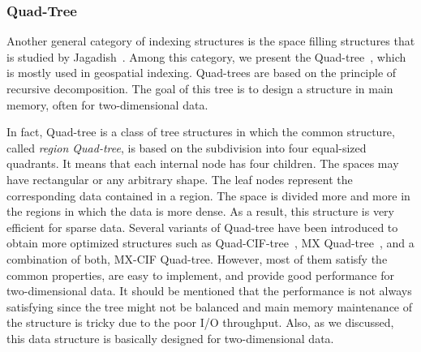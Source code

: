 \documentclass[a4paper,12pt]{article}
\begin{document}
\subsubsection{Quad-Tree}
\label{quad-tree-based}
Another general category of indexing structures is the space filling structures that is studied by Jagadish~\cite{spacefilling}.
Among this category, we present the Quad-tree~\cite{quadtree}, which is mostly used in geospatial indexing. Quad-trees are based on the principle of recursive decomposition. The goal of this tree is to design a structure in main memory, often for two-dimensional data. 

In fact, Quad-tree is a class of tree structures in which the common structure, called \textit{region Quad-tree}, is based on the subdivision into four equal-sized quadrants. It means that each internal node has four children. The spaces may have rectangular or any arbitrary shape. The leaf nodes represent the corresponding data contained in a region. The space is divided more and more in the regions in which the data is more dense. As a result, this structure is very efficient for sparse data.
Several variants of Quad-tree have been introduced to obtain more optimized structures such as Quad-CIF-tree~\cite{quadcif}, MX Quad-tree~\cite{quadmx}, and a combination of both, MX-CIF Quad-tree. However, most of them satisfy the common properties, are easy to implement, and provide good performance for two-dimensional data.
It should be mentioned that the performance is not always satisfying since the tree might not be balanced and main memory maintenance of the structure is tricky due to the poor I/O throughput. Also, as we discussed, this data structure is basically designed for two-dimensional data. %
\end{document}

